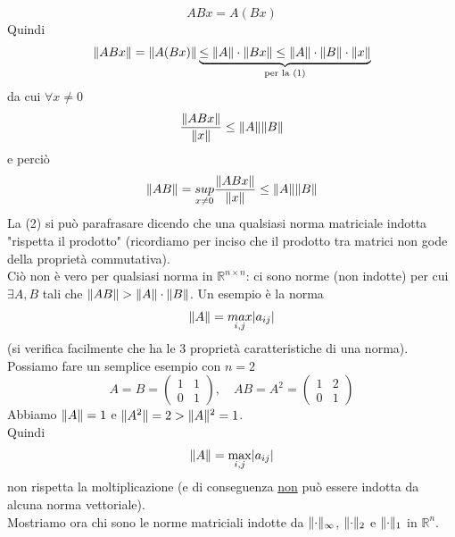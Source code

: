 \documentclass[12pt,a4paper]{article}
\DeclarePairedDelimiter{\abs}{\lvert}{\rvert}
\DeclarePairedDelimiter{\norma}{\lVert}{\rVert}
\begin{document}
\[ABx = A(Bx)\]
Quindi
\[\norma{ABx} = \norma{A(Bx)} \underbrace{\le \norma{A} \cdot \norma{Bx} \le \norma{A} \cdot \norma{B} \cdot \norma{x}}_{\text{per la (1)}}\]
da cui $\forall x \ne 0$
\[\frac{\norma{ABx}}{\norma{x}} \le \norma{A} \norma{B}\]
e perciò
\[\norma{AB} = \underset{x \neq 0}{sup} \frac{\norma{ABx}}{\norma{x}} \le \norma{A} \norma{B}\]
La (2) si può parafrasare dicendo che una qualsiasi norma matriciale indotta "rispetta il prodotto" (ricordiamo per inciso che il prodotto tra matrici non gode della proprietà commutativa).\\ Ciò non è vero per qualsiasi norma in $\mathbb{R}^{n\times n}$: ci sono norme (non indotte) per cui $\exists A,B$ tali che $\norma{AB}>\norma{A}\cdot\norma{B}$. Un esempio è la norma
\begin{equation*}
    \norma{A}=\underset{i,j}{max}|a_{ij}|
\end{equation*}
(si verifica facilmente che ha le 3 proprietà caratteristiche di una
norma). \\
Possiamo fare un semplice esempio con $n = 2$
\[A = B = \begin{pmatrix}
    1 & 1 \\
    0 & 1
\end{pmatrix}, \quad AB = A^2 =
\begin{pmatrix}
    1 & 2 \\
    0 & 1
\end{pmatrix}\]
Abbiamo $\norma{A} = 1$ e $\norma{A^2} = 2 > \norma{A}^2 = 1$.\\
Quindi 
\[\norma{A} = \max_{i,j} \abs{a_{ij}}\]
non rispetta la moltiplicazione (e di conseguenza \underline{non} può essere indotta da alcuna norma vettoriale).\\
Mostriamo ora chi sono le norme matriciali indotte da
$\norma{\cdot}_{\infty}$, $\norma{\cdot}_2$ e $\norma{\cdot}_1$ in $\mathbb{R}^n$.\\
\end{document}
